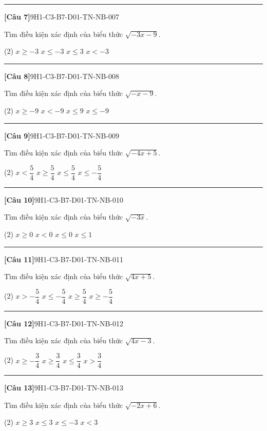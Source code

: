\documentclass[12pt,a4paper]{article}
\newif\ifloigiai
\newenvironment{cauhoi}[2]{%
  \par\medskip\noindent\rule{\textwidth}{0.4pt}\par\nopagebreak
  \noindent\textbf{[#1]}\hfill{\scriptsize\ttfamily #2}\par\nopagebreak\smallskip}{\par}
\newcommand{\dapan}[1]{\ifloigiai\par\smallskip\noindent\textit{Đáp án:} \textbf{#1}\par\fi}
\begin{document}
\begin{cauhoi}{Câu 7}{9H1-C3-B7-D01-TN-NB-007}
Tìm điều kiện xác định của biểu thức $\sqrt{-3x - 9}$.
\begin{tasks}(2)
\task $x\ge -3$
\task $x\le -3$
\task $x\le 3$
\task $x<-3$
\end{tasks}
\dapan{B}
\end{cauhoi}
\begin{cauhoi}{Câu 8}{9H1-C3-B7-D01-TN-NB-008}
Tìm điều kiện xác định của biểu thức $\sqrt{-x - 9}$.
\begin{tasks}(2)
\task $x\ge -9$
\task $x<-9$
\task $x\le 9$
\task $x\le -9$
\end{tasks}
\dapan{D}
\end{cauhoi}
\begin{cauhoi}{Câu 9}{9H1-C3-B7-D01-TN-NB-009}
Tìm điều kiện xác định của biểu thức $\sqrt{-4x + 5}$.
\begin{tasks}(2)
\task $x<\dfrac{5}{4}$
\task $x\ge \dfrac{5}{4}$
\task $x\le \dfrac{5}{4}$
\task $x\le -\dfrac{5}{4}$
\end{tasks}
\dapan{C}
\end{cauhoi}
\begin{cauhoi}{Câu 10}{9H1-C3-B7-D01-TN-NB-010}
Tìm điều kiện xác định của biểu thức $\sqrt{-3x}$.
\begin{tasks}(2)
\task $x\ge 0$
\task $x<0$
\task $x\le 0$
\task $x\le 1$
\end{tasks}
\dapan{C}
\end{cauhoi}
\begin{cauhoi}{Câu 11}{9H1-C3-B7-D01-TN-NB-011}
Tìm điều kiện xác định của biểu thức $\sqrt{4x + 5}$.
\begin{tasks}(2)
\task $x>-\dfrac{5}{4}$
\task $x\le -\dfrac{5}{4}$
\task $x\ge \dfrac{5}{4}$
\task $x\ge -\dfrac{5}{4}$
\end{tasks}
\dapan{D}
\end{cauhoi}
\begin{cauhoi}{Câu 12}{9H1-C3-B7-D01-TN-NB-012}
Tìm điều kiện xác định của biểu thức $\sqrt{4x - 3}$.
\begin{tasks}(2)
\task $x\ge -\dfrac{3}{4}$
\task $x\ge \dfrac{3}{4}$
\task $x\le \dfrac{3}{4}$
\task $x>\dfrac{3}{4}$
\end{tasks}
\dapan{B}
\end{cauhoi}
\begin{cauhoi}{Câu 13}{9H1-C3-B7-D01-TN-NB-013}
Tìm điều kiện xác định của biểu thức $\sqrt{-2x + 6}$.
\begin{tasks}(2)
\task $x\ge 3$
\task $x\le 3$
\task $x\le -3$
\task $x<3$
\end{tasks}
\dapan{B}
\end{cauhoi}
\end{document}
